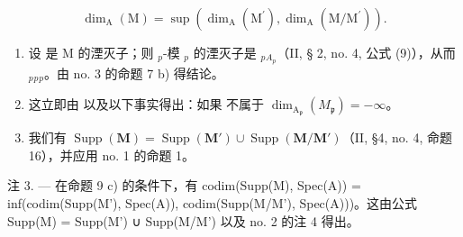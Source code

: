\[
\dim_ {\mathrm{A}} (\mathrm{M}) = \sup \left(\dim_ {\mathrm{A}} \left(\mathrm{M} ^ {\prime}\right), \dim_ {\mathrm{A}} \left(\mathrm{M} / \mathrm{M} ^ {\prime}\right)\right).
\]

\begin{enumerate}
\def\labelenumi{\alph{enumi})}
\item
  设  是 M 的湮灭子；则 \(_{p}\)-模 \(_{p}\) 的湮灭子是 \(_{p}\)\(_{A_{p}}\)（II, § 2, no. 4, 公式 (9)），从而 \(_{p}\)\(_{p}\)\(_{p}\)。由 no. 3 的命题 7 b) 得结论。
\item
  这立即由  以及以下事实得出：如果  不属于 \(\dim_{\mathrm{A}_{\mathfrak{p}}}(M_{\mathfrak{p}}) = -\infty\)。
\item
  我们有 \(\operatorname{Supp}(\mathbf{M}) = \operatorname{Supp}(\mathbf{M}') \cup \operatorname{Supp}(\mathbf{M} / \mathbf{M}')\)（II, §4, no. 4, 命题 16），并应用 no. 1 的命题 1。
\end{enumerate}

注 3. --- 在命题 9 c) 的条件下，有 codim(Supp(M), Spec(A)) = inf(codim(Supp(M'), Spec(A)), codim(Supp(M/M'), Spec(A)))。这由公式 Supp(M) = Supp(M') ∪ Supp(M/M') 以及 no. 2 的注 4 得出。

